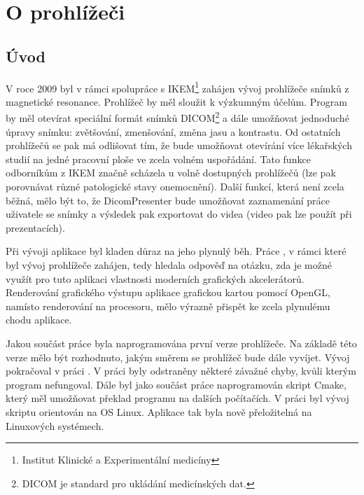 \chapter*{O prohlížeči}
\section*{Úvod}
V roce 2009 byl v rámci spolupráce s IKEM\footnote{Institut Klinické a Experimentální medicíny} zahájen vývoj prohlížeče snímků z magnetické resonance. Prohlížeč by měl sloužit k výzkumným účelům. Program by měl otevírat speciální formát snímků DICOM\footnote{DICOM je standard pro ukládání medicínských dat.} a dále umožňovat jednoduché úpravy snímku: zvětšování, zmenšování, změna jasu a kontrastu. Od ostatních prohlížečů se pak má odlišovat tím, že bude umožňovat otevírání více lékařských studií na jedné pracovní ploše ve zcela volném uspořádání. Tato funkce odborníkům z IKEM značně scházela u volně dostupných prohlížečů (lze pak porovnávat různé patologické stavy onemocnění). Další funkcí, která není zcela běžná, mělo být to, že DicomPresenter bude umožňovat zaznamenání práce uživatele se snímky a výsledek pak exportovat do videa (video pak lze použít při prezentacích).

Při vývoji aplikace byl kladen důraz na jeho plynulý běh. Práce \cite{neskudla}, v rámci které byl vývoj prohlížeče zahájen, tedy hledala odpověď na otázku, zda je možné využít pro tuto aplikaci vlastnosti moderních grafických akcelerátorů. Renderování grafického výstupu aplikace grafickou kartou pomocí OpenGL, namísto renderování na procesoru, mělo výrazně přispět ke zcela plynulému chodu aplikace.

Jakou součást práce \cite{neskudla} byla naprogramována první verze prohlížeče. Na základě této verze mělo být rozhodnuto, jakým směrem se prohlížeč bude dále vyvíjet. Vývoj pokračoval v práci \cite{flaska}. V práci byly odstraněny některé závažné chyby, kvůli kterým program nefungoval. Dále byl jako součást práce naprogramován skript Cmake, který měl umožňovat překlad programu na dalších počítačích. V práci byl vývoj skriptu orientován na OS Linux. Aplikace tak byla nově přeložitelná na Linuxových systémech.


